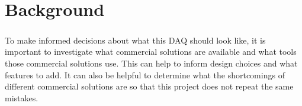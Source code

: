 \chapter{Background}

\paragraph{}
To make informed decisions about what this DAQ should look like, it is important to investigate what commercial solutions are available and what tools those commercial solutions use.
This can help to inform design choices and what features to add.
It can also be helpful to determine what the shortcomings of different commercial solutions are so that this project does not repeat the same mistakes.